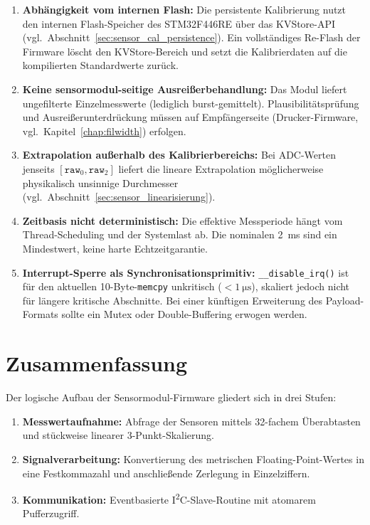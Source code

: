 \begin{enumerate}
  \item \textbf{Abhängigkeit vom internen Flash:} Die persistente Kalibrierung nutzt den internen Flash-Speicher des STM32F446RE über das KVStore-API (vgl.\ Abschnitt~\ref{sec:sensor_cal_persistence}). Ein vollständiges Re-Flash der Firmware löscht den KVStore-Bereich und setzt die Kalibrierdaten auf die kompilierten Standardwerte zurück.
  \item \textbf{Keine sensormodul-seitige Ausreißerbehandlung:} Das Modul liefert ungefilterte Einzelmesswerte (lediglich burst-gemittelt). Plausibilitätsprüfung und Ausreißerunterdrückung müssen auf Empfängerseite (Drucker-Firmware, vgl.\ Kapitel~\ref{chap:filwidth}) erfolgen.
  \item \textbf{Extrapolation außerhalb des Kalibrierbereichs:} Bei ADC-Werten jenseits $[\mathtt{raw}_0, \mathtt{raw}_2]$ liefert die lineare Extrapolation möglicherweise physikalisch unsinnige Durchmesser (vgl.\ Abschnitt~\ref{sec:sensor_linearisierung}).
  \item \textbf{Zeitbasis nicht deterministisch:} Die effektive Messperiode hängt vom Thread-Scheduling und der Systemlast ab. Die nominalen \qty{2}{\milli\second} sind ein Mindestwert, keine harte Echtzeitgarantie.
  \item \textbf{Interrupt-Sperre als Synchronisationsprimitiv:} \texttt{\_\_disable\_irq()} ist für den aktuellen \num{10}-Byte-\texttt{memcpy} unkritisch ($<\qty{1}{\micro\second}$), skaliert jedoch nicht für längere kritische Abschnitte. Bei einer künftigen Erweiterung des Payload-Formats sollte ein Mutex oder Double-Buffering erwogen werden.
\end{enumerate}

\section{Zusammenfassung}

Der logische Aufbau der Sensormodul-Firmware gliedert sich in drei Stufen:
\begin{enumerate}
  \item \textbf{Messwertaufnahme:} Abfrage der Sensoren mittels 32-fachem Überabtasten und stückweise linearer 3-Punkt-Skalierung.
  \item \textbf{Signalverarbeitung:} Konvertierung des metrischen Floating-Point-Wertes in eine Festkommazahl und anschließende Zerlegung in Einzelziffern.
  \item \textbf{Kommunikation:} Eventbasierte I\textsuperscript{2}C-Slave-Routine mit atomarem Pufferzugriff.
\end{enumerate}

